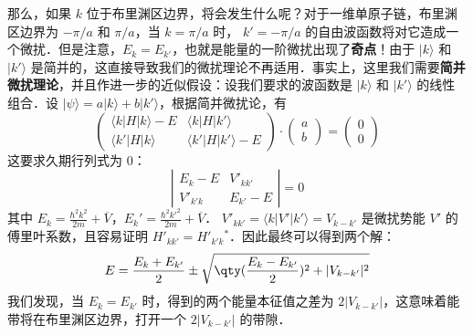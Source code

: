 那么，如果 $k$ 位于布里渊区边界，将会发生什么呢？对于一维单原子链，布里渊区边界为 $-\pi/a$ 和 $\pi/a$，当 $k=\pi/a$ 时， $k'=-\pi/a$ 的自由波函数将对它造成一个微扰．但是注意，$E_k=E_{k'}$，也就是能量的一阶微扰出现了\textbf{奇点}！由于 $|k\rangle$ 和 $|k'\rangle$ 是简并的，这直接导致我们的微扰理论不再适用．事实上，这里我们需要\textbf{简并微扰理论}，并且作进一步的近似假设：设我们要求的波函数是 $|k\rangle$ 和 $|k'\rangle$ 的线性组合．设 $|\psi\rangle=a|k\rangle+b|k'\rangle$，根据简并微扰论，有
\begin{equation}
\begin{pmatrix}
\langle k|H|k\rangle-E & \langle k|H|k'\rangle \\
\langle k'|H|k\rangle & \langle k'|H|k'\rangle - E   
\end{pmatrix}
\cdot
\begin{pmatrix}
a \\ b
\end{pmatrix}=
\begin{pmatrix}
0\\0
\end{pmatrix}
\end{equation}
这要求久期行列式为 $0$：
\begin{equation}
\left|
\begin{matrix}
E_k-E & V'_{k k'}\\
V'_{k'k}  & E_{k'}-E
\end{matrix}
\right|
=0
\end{equation}
其中 $E_k=\frac{\hbar^2 k^2}{2m}+\overline V$，$E_k'=\frac{\hbar^2 k'^2}{2m}+\overline V$． $V'_{kk'}=\langle k|V'|k'\rangle=V_{k-k'}$ 是微扰势能 $V'$ 的傅里叶系数，且容易证明 $H'_{kk'}=H'_{k'k}{}^*$．因此最终可以得到两个解：
\begin{equation}
E=\frac{E_k+E_{k'}}{2}\pm \sqrt{\qty(\frac{E_k-E_{k'}}{2})^2+|V_{k-k'}|^2}
\end{equation}
我们发现，当 $E_k=E_{k'}$ 时，得到的两个能量本征值之差为 $2|V_{k-k'}|$，这意味着能带将在布里渊区边界，打开一个 $2|V_{k-k'}|$ 的带隙．